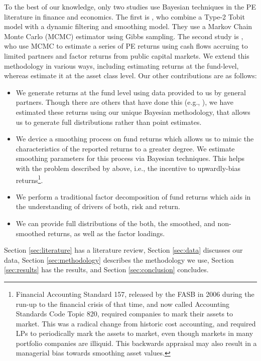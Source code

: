 \documentclass[11pt]{article}
\begin{document}
To the best of our knowledge, only two studies use Bayesian techniques in the PE literature in finance and economics. The first is \cite{Korteweg2011}, who  combine a Type-2 Tobit model with a dynamic filtering and smoothing model. They use a Markov Chain Monte Carlo (MCMC) estimator using Gibbs sampling. The second study is \cite{Ang2014}, who use MCMC to estimate a series of PE returns using cash flows accruing to limited partners and factor returns from public capital markets. We extend this methodology in various ways, including estimating returns at the fund-level, whereas \cite{Ang2014} estimate it at the asset class level. Our other contributions are as follows:
\begin{itemize}
	\item We generate returns at the fund level using data provided to us by general partners. Though there are others that have done this (e.g., \cite{Long1996}), we have estimated these returns using our unique Bayesian methodology, that allows us to generate full distributions rather than point estimates.
	\item We device a smoothing process on fund returns which allows us to mimic the characteristics of the reported returns to a greater degree. We estimate smoothing parameters for this process via Bayesian techniques. This helps with the problem described by \cite{Gottschalg2007} above, i.e., the incentive to upwardly-bias returns\footnote{Financial Accounting Standard 157, released by the FASB in 2006 during the run-up to the financial crisis of that time, and now called Accounting Standards Code Topic 820, required companies to mark their assets to market. This was a radical change from historic cost accounting, and required LPs to periodically mark the assets to market, even though markets in many portfolio companies are illiquid. This backwards appraisal may also result in a managerial bias towards smoothing asset values.}.
	\item We perform a traditional factor decomposition of fund returns which aids in the understanding of drivers of both, risk and return.
	\item We can provide full distributions of the both, the smoothed, and non-smoothed returns, as well as the factor loadings.
\end{itemize}

Section \ref{sec:literature} has a literature review, Section \ref{sec:data} discusses our data, Section \ref{sec:methodology} describes the methodology we use, Section \ref{sec:results} has the results, and Section \ref{sec:conclusion} concludes.
\end{document}

